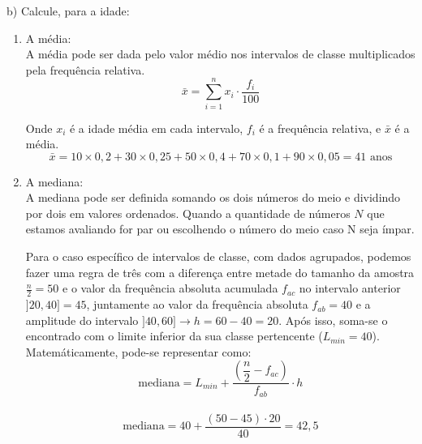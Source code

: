 b) Calcule, para a idade:
\\

\begin{enumerate}[i]
    \item A média: \\

          A média pode ser dada pelo valor médio nos intervalos de classe multiplicados pela frequência relativa.
          \\

          \[
              \bar{x} = \sum_{i=1}^{n} x_i \cdot \frac{f_i}{100}
          \]

          Onde $x_i$ é a idade média em cada intervalo, $f_i$ é a frequência relativa, e $\bar{x}$ é a média.
          \\

          \begin{equation}
              \bar{x}= 10 \times 0,2+30\times 0,25+50\times 0,4+70\times 0,1+90\times 0,05 = 41 \text{ anos}
          \end{equation}

    \item A mediana: \\

          A mediana pode ser definida somando os dois números do meio e dividindo por dois em valores ordenados. Quando a quantidade de números $N$ que estamos avaliando for par ou escolhendo o número do meio caso N seja ímpar.

          Para o caso específico de intervalos de classe, com dados agrupados, podemos fazer uma regra de três com a diferença entre metade do tamanho da amostra $\frac{n}{2} = 50$ e o valor da frequência absoluta acumulada $f_{ac}$ no intervalo anterior $]20,40]=45$, juntamente ao valor da frequência absoluta $f_{ab}=40$ e a amplitude do intervalo $]40,60]\rightarrow h=60-40=20$. Após isso, soma-se o encontrado com o limite inferior da sua classe pertencente ($L_{min}=40$). Matemáticamente, pode-se representar como:
          \\

          \[
              \text{mediana} = L_{min} + \frac{\left(\dfrac{n}{2}-f_{ac}\right)}{f_{ab}}\cdot h
          \]
          \\

          \begin{equation}
              \text{mediana} = 40 + \frac{(50-45)\cdot 20}{40} = 42,5
          \end{equation}


\end{enumerate}
